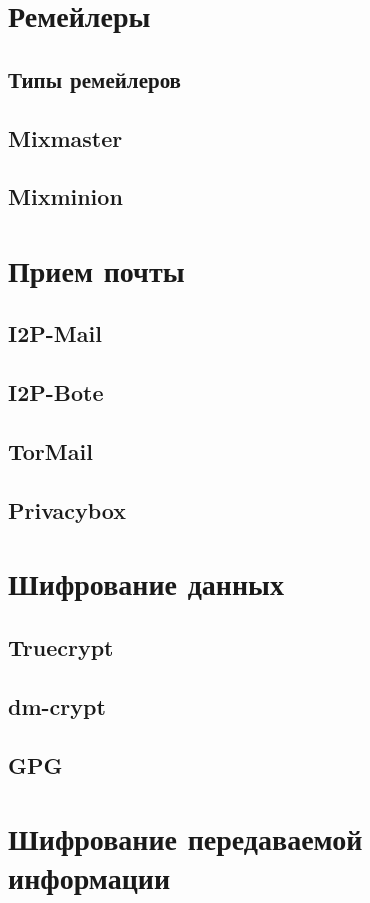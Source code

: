 \section{Ремейлеры}
\subsection{Типы ремейлеров}
\subsection{Mixmaster}
\subsection{Mixminion}

\section{Прием почты}
\subsection{I2P-Mail}
\subsection{I2P-Bote}
\subsection{TorMail}
\subsection{Privacybox}

\section{Шифрование данных}
\subsection{Truecrypt}
\subsection{dm-crypt}
\subsection{GPG}

\section{Шифрование передаваемой информации}
